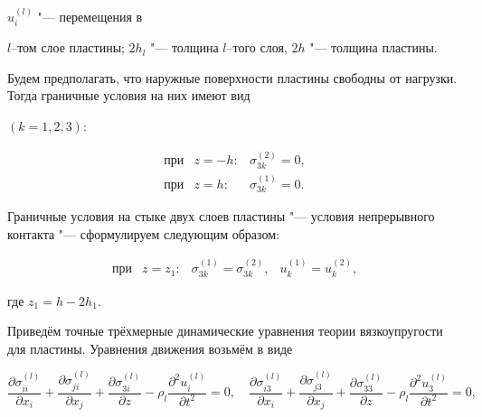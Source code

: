  $u_i^{(l)} $ "--- перемещения в

 $l$--том слое пластины; $2h_l$ "--- толщина $l$--того слоя, $2h$ "--- толщина пластины.



Будем предполагать, что наружные поверхности пластины свободны от нагрузки. Тогда граничные условия на них имеют вид

$(k={1, 2, 3})$:

\begin{equation}

\label{anofr:eq_1}

\begin{array}{lrl}

\text{при} & z=-h: & \sigma _{3k}^{(2)} =0,  \\

\text{при} & z=h: & \sigma _{3k}^{(1)} =0.

\end{array}

\end{equation}

Граничные условия на стыке двух слоев пластины "--- условия непрерывного контакта "--- сформулируем следующим образом:

\begin{equation}

\label{anofr:eq_2}

\begin{array}{lrll}

  \text{при} & z=z_{1} :& \sigma _{3k}^{(1)} =\sigma _{3k}^{(2)} ,& u_{k}^{(1)} =u_{k}^{(2)},

  \end{array}

\end{equation}

где $z_1 =h-2h_1$.



Приведём точные трёхмерные динамические уравнения теории вязкоупругости для пластины. Уравнения движения возьмём в виде

\begin{equation}

\label{anofr:eq_3}

\frac{\partial \sigma _{ii}^{(l)} }{\partial x_i} +\frac{\partial \sigma _{ji}^{(l)} }{\partial x_j } +

\frac{\partial \sigma _{3i}^{(l)} }{\partial z} -\rho _l \frac{\partial^2 u_i^{(l)} }{\partial t^2} =0, \quad

\frac{\partial \sigma _{i3}^{(l)} }{\partial x_i} +\frac{\partial \sigma _{j3}^{(l)}}{\partial x_j} +

\frac{\partial \sigma _{33}^{(l)} }{\partial z} -\rho _l \frac{\partial ^2 u_3^{(l)} }{\partial t^2} =0,

\end{equation}


